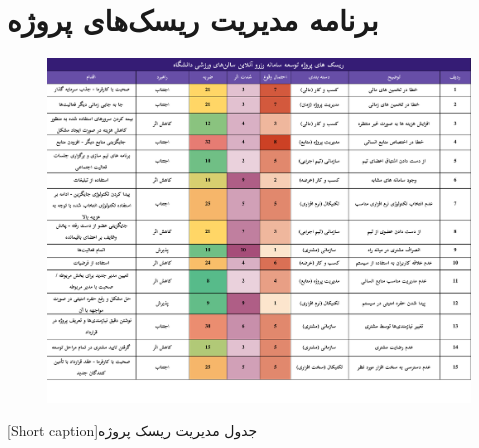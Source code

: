 \section{
برنامه مدیریت ریسک‌های پروژه
}

\begin{center}
  \begin{figure} [h!]
    { \includegraphics[width=\textwidth , scale=1.5]{appandecies/risks.pdf}}
  \end{figure}
  [Short caption]{جدول مدیریت ریسک پروژه}
\end{center}
